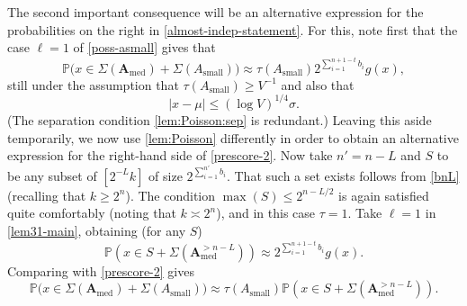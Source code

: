 \documentclass[11pt,reqno]{amsart}
\numberwithin{equation}{section}
\theoremstyle{definition}
\theoremstyle{remark}
\newcommand{\mb}{\mathbb}
\newcommand{\mbf}{\mathbf}
\renewcommand{\le}{\leqslant}
\renewcommand{\ge}{\geqslant}
\def\sml{\operatorname{small}}
\def\med{\operatorname{med}}
\begin{document}
The second important consequence will be an alternative expression for the probabilities on the right in \cref{almost-indep-statement}. For this, note first that the case $\ell = 1$ of \cref{poss-asmall} gives that
\begin{equation} \label{prescore-2} \mb{P}\big(x \in \Sigma(\mbf{A}_{\med}) + \Sigma(A_{\sml})\big) \approx \tau(A_{\sml}) 2^{\sum_{i =1}^{n + 1 - t} b_i} g(x),\end{equation} still under the assumption that $\tau(A_{\sml}) \ge V^{-1}$ and also that 
\begin{equation}\label{x-assump} |x - \mu| \le (\log V)^{1/4}\sigma.\end{equation} (The separation condition \cref{lem:Poisson:sep} is redundant.) Leaving this aside temporarily, we now use \cref{lem:Poisson} differently in order to obtain an alternative expression for the right-hand side of \cref{prescore-2}.
Now take $n' = n - L$ and $S$ to be any subset of $[2^{- L}k]$ of size $2^{\sum_{i =1}^{n'} b_i}$. That such a set exists follows from \cref{bnL} (recalling that $k \ge 2^n$). The condition $\max(S) \le 2^{n - L/2}$ is again satisfied quite comfortably (noting that $k \asymp 2^n$), and in this case $\tau = 1$. Take $\ell = 1$ in \cref{lem31-main}, obtaining (for any $S$) 
\begin{equation*}  \mb{P}(x \in S + \Sigma(\mbf{A}_{\med}^{> n - L})) \approx 2^{\sum_{i=1}^{n + 1 - t} b_i} g(x).\end{equation*} Comparing with \cref{prescore-2} gives
\begin{equation}\label{prescore-3c} 
 \mb{P}\big(x \in \Sigma(\mbf{A}_{\med}) + \Sigma(A_{\sml})\big) \approx \tau(A_{\sml}) \mb{P}(x \in S + \Sigma(\mbf{A}_{\med}^{> n - L})) .
\end{equation}
\end{document}

